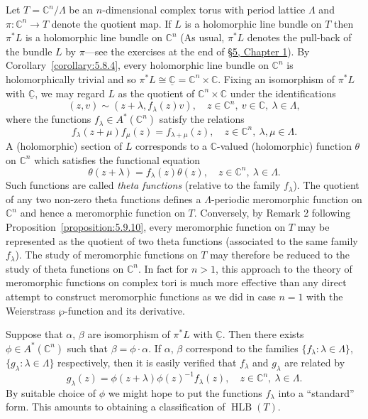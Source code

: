 Let $T=\mathbb C^n/\Lambda$ be an $n$-dimensional complex torus with period lattice $\Lambda$ and $\pi:\mathbb C^n\to T$ denote the quotient map. If $L$ is a holomorphic line bundle on $T$ then $\pi^*L$ is a holomorphic line bundle on $\mathbb C^n$ (As usual, $\pi^*L$ denotes the pull-back of the bundle $L$ by $\pi$---see the exercises at the end of \hyperref[sec:1:5]{\S5, Chapter 1}). By Corollary~\ref{corollary:5.8.4}, every holomorphic line bundle on $\mathbb C^n$ is holomorphically trivial and so $\pi^*L\cong\underline{\mathbb C}=\mathbb C^n\times\mathbb C$. Fixing an isomorphism of $\pi^*L$ with $\underline{\mathbb C}$, we may regard $L$ as the quotient of $\mathbb C^n\times\mathbb C$ under the identifications
\[(z,v)\sim(z+\lambda,f_\lambda(z)v),\quad z\in\mathbb C^n,\ v\in\mathbb C,\ \lambda\in\Lambda,\]
where the functions $f_\lambda\in A^*(\mathbb C^n)$ satisfy the relations
\[f_\lambda(z+\mu)f_\mu(z)=f_{\lambda+\mu}(z),\quad z\in\mathbb C^n,\ \lambda,\mu\in\Lambda.\tag{A}\label{eq:5:a:2}\]
A (holomorphic) section of $L$ corresponds to a $\mathbb C$-valued (holomorphic) function $\theta$ on $\mathbb C^n$ which satisfies the functional equation
\[\theta(z+\lambda)=f_\lambda(z)\theta(z),\quad z\in\mathbb C^n,\ \lambda\in\Lambda.\]
Such functions are called \emph{theta functions} (relative to the family $f_\lambda$). The quotient of any two non-zero theta functions defines a $\Lambda$-periodic meromorphic function on $\mathbb C^n$ and hence a meromorphic function on $T$.
Conversely, by Remark 2 following Proposition~\ref{proposition:5.9.10}, every meromorphic function on $T$ may be represented as the quotient of two theta functions (associated to the same family $f_\lambda$). The study of meromorphic functions on $T$ may therefore be reduced to the study of theta functions on $\mathbb C^n$. In fact for $n>1$, this approach to the theory of meromorphic functions on complex tori is much more effective than any direct attempt to construct meromorphic functions as we did in case $n=1$ with the Weierstrass $\wp$-function and its derivative.

Suppose that $\alpha$, $\beta$ are isomorphism of $\pi^*L$ with $\underline{\mathbb C}$. Then there exists $\phi\in A^*(\mathbb C^n)$ such that $\beta=\phi\cdot\alpha$. If $\alpha$, $\beta$ correspond to the families $\{f_\lambda:\lambda\in\Lambda\}$, $\{g_\lambda:\lambda\in\Lambda\}$ respectively, then it is easily verified that $f_\lambda$ and $g_\lambda$ are related by
\[g_\lambda(z)=\phi(z+\lambda)\phi(z)^{-1}f_\lambda(z),\quad z\in\mathbb C^n,\ \lambda\in\Lambda.\]
By suitable choice of $\phi$ we might hope to put the functions $f_\lambda$ into a ``standard'' form. This amounts to obtaining a classification of $\operatorname{HLB}(T)$.
